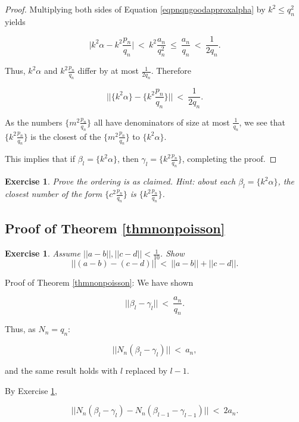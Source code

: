 \documentclass[12pt,letterpaper]{report}
\newcommand\be{\begin{equation}}
\newcommand\ee{\end{equation}}
\newtheorem{exe}[thm]{Exercise}
\newcommand{\pn}{p_n}
\newcommand{\qn}{q_n}
\begin{document}
\begin{proof}
Multiplying both sides of Equation \ref{eqpnqngoodapproxalpha} by
$k^2 \le q_n^2$ yields

\be \Big| k^2 \alpha - k^2 \frac{\pn}{\qn} \Big| \ < \ k^2
\frac{a_n}{q_n^2} \ \le \ \frac{a_n}{q_n} \ < \ \frac{1}{2q_n}.
\ee

Thus, $k^2 \alpha$ and $k^2 \frac{\pn}{\qn}$ differ by at most
$\frac{1}{2\qn}$. Therefore

\be \Big|\Big| \Big\{k^2 \alpha\Big\} - \Big\{k^2
\frac{\pn}{\qn}\Big\} \Big|\Big| \ < \ \frac{1}{2q_n}. \ee

As the numbers $\{m^2 \frac{\pn}{\qn} \}$ all have denominators of
size at most $\frac{1}{\qn}$, we see that $\{k^2
\frac{\pn}{\qn}\}$ is the closest of the $\{m^2 \frac{\pn}{\qn}
\}$ to $\{k^2 \alpha\}$.

This implies that if $\beta_l = \{k^2 \alpha\}$, then $\gamma_l =
\{k^2 \frac{\pn}{\qn}\}$, completing the proof.

\end{proof}

\begin{exe} Prove the ordering is as claimed. Hint: about each
$\beta_l = \{k^2 \alpha\}$, the closest number of the form $\{c^2
\frac{\pn}{\qn}\}$ is $\{k^2 \frac{\pn}{\qn}\}$. \end{exe}


\subsection{Proof of Theorem \ref{thmnonpoisson}}

\begin{exe}\label{exemodonedist} Assume $||a - b||, ||c - d||
< \frac{1}{10}$. Show \be || (a-b) - (c-d) || \ < \ ||a-b|| + ||c
- d||. \ee
\end{exe}

Proof of Theorem \ref{thmnonpoisson}: We have shown

\be ||\beta_l - \gamma_l|| \ < \ \frac{a_n}{\qn}. \ee

Thus, as $N_n = q_n$:

\be \Big|\Big|N_n(\beta_l - \gamma_l)\Big|\Big| \ < \ a_n, \ee

and the same result holds with $l$ replaced by $l-1$.

By Exercise \ref{exemodonedist},

\be \Big|\Big|N_n(\beta_l - \gamma_l) - N_n(\beta_{l-1} -
\gamma_{l-1}) \Big|\Big| \ < \ 2a_n. \ee
\end{document}
